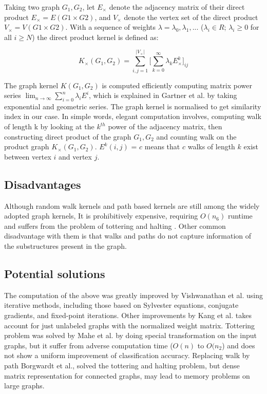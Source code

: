 Taking two graph $G_{1}, G_{2}$, let $E_{\times}$ denote the adjacency matrix
of their direct product $E_{\times} = E (G1 \times G2) $, and $V_{\times}$ denote the vertex set of the direct product  $V_{\times} = V (G1 \times G2) $. With a sequence of weights $\lambda = \lambda_{0}, \lambda_{1},...$
($\lambda_{i} \in R$; $\lambda_{i} \geq 0$ for all $i \geq N$) the direct product kernel is defined as:

%
\begin{equation}
K_{\times} (G_{1}, G_{2}) = \displaystyle\sum_{i,j=1}^{| V_{\times} |} \Bigg[ \displaystyle\sum_{k=0}^{\infty} \lambda_{k}E_{\times}^{k} \Bigg]_{ij}
\end{equation}
%

The graph kernel $K(G_{1}, G_{2})$ is computed efficiently computing matrix power series $\lim_{n \to \infty} \sum_{i=0}^{n} \lambda_{i}E^{i}$, which is explained in  Gartner et al. \citep{Gartner2003} by taking exponential and geometric series. The graph kernel is normalised to get similarity index in our case. In simple words, elegant computation involves, computing walk of length k by looking at the $k^{th}$ power of the adjacency matrix, then constructing direct product of the graph $G_{1}, G_{2}$ and counting walk on the product graph $K_{\times} (G_{1}, G_{2})$.  $E^{k} (i,j)$ = $c$ means that $c$ walks of length $k$ exist between vertex $i$ and vertex $j$. 

\subsection{Disadvantages}
Although random walk kernels and path based kernels
are still among the widely adopted graph kernels, It is prohibitively expensive, requiring $O(n_{6})$ runtime and suffers 
from the problem of tottering \citep{Mahe2004} and halting \citep{Sugiyama2015}. Other common disadvantage with them is that walks and paths do not capture information of the substructures present in the graph.

\subsection{Potential solutions}

The computation of the above was greatly improved by Vishwanathan et al. \citep{Vishwanathan2010} using iterative methods, including those based on Sylvester equations, conjugate gradients, and fixed-point iterations. Other improvements by Kang et al. \citep{Kang2012} takes account for just unlabeled graphs with the normalized weight matrix. Tottering problem was solved by  Mahe et al.\citep{Mahe2004} by doing special transformation on the input graphs, but it suffer from adverse computation time ($O(n)$ to $O(n_{2}$) and does not show a uniform improvement of classification accuracy. Replacing walk by path  Borgwardt et al.\citep{Borgwardt2005}, solved the tottering and  halting problem, but dense matrix representation for connected graphs, may lead to memory problems on large graphs. 

